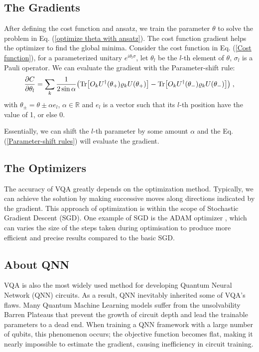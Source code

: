 \subsection{The Gradients}
After defining the cost function and ansatz, we train the parameter $\theta$ to solve the problem in Eq. (\ref{optimize theta with ansatz}).
The cost function gradient helps the optimizer to find the global minima. 
Consider the cost function in Eq. (\ref{Cost function}), for a parameterized unitary $e^{i \theta_l \sigma}$, let $\theta_l$ be the $l$-th element of $\theta$, $\sigma_l$ is a Pauli operator. 
We can evaluate the gradient with the Parameter-shift rule:
\begin{equation}
    \frac{\partial C}{\partial\theta_l}
    = \sum_k \frac{1}{2 \sin{\alpha}} 
    \left( 
        \Tr[O_k U^\dagger(\theta_+) \rho_k U(\theta_+)] 
        - \Tr[O_k U^\dagger(\theta_-) \rho_k U(\theta_-)]
    \right) \;,
    \label{Parameter-shift rules}
\end{equation}
with $\theta_{\pm} = \theta \pm \alpha e_l$, $\alpha \in \mathbb{R}$ and $e_l$ is a vector such that its $l$-th position have the value of 1, or else 0.

Essentially, we can shift the $l$-th parameter by some amount $\alpha$ and the Eq. (\ref{Parameter-shift rules}) will evaluate the gradient. 


\subsection{The Optimizers}
The accuracy of VQA greatly depends on the optimization method.
Typically, we can achieve the solution by making successive moves along directions indicated by the gradient.
This approach of optimization is within the scope of Stochastic Gradient Descent (SGD).
One example of SGD is the ADAM optimizer \cite{kingmaAdamMethodStochastic2014}, which can varies the size of the steps taken during optimisation to produce more efficient and precise results compared to the basic SGD.


\subsection{About QNN}
VQA is also the most widely used method for developing Quantum Neural Network (QNN) circuits. 
As a result, QNN inevitably inherited some of VQA's flaws.
Many Quantum Machine Learning models suffer from the unsolvability Barren Plateaus \cite{zhaoReviewQuantumNeural2021} that prevent the growth of circuit depth and lead the trainable parameters to a dead end.
When training a QNN framework with a large number of qubits, this phenomenon occurs; the objective function becomes flat, making it nearly impossible to estimate the gradient, \cite{mccleanBarrenPlateausQuantum2018, zhaoAnalyzingBarrenPlateau2021} causing inefficiency in circuit training. 

